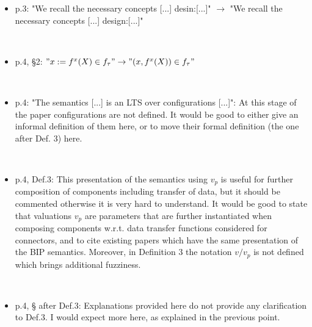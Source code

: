 \begin{itemize}


\item p.3: "We recall the necessary concepts [...] desin:[...]" $\rightarrow$ "We recall the 
necessary concepts [...] design:[...]"

~

\done

\item p.4, §2: $"x := f^x(X) \in f_{\tau}" \rightarrow "(x,f^x(X)) \in f_{\tau}"$

~

\done

\item p.4: "The semantics [...] is an LTS over configurations [...]": At this 
stage of the paper configurations are not defined. It would be good to either 
give an informal definition of them here, or to move their formal definition 
(the one after Def. 3) here.

~

\done
{}


\item p.4, Def.3: This presentation of the semantics using $v_p$ is useful for 
further composition of components including transfer of data, but it should 
be commented otherwise it is very hard to understand. It would be good to 
state that valuations $v_p$ are parameters that are further instantiated when 
composing components w.r.t. data transfer functions considered for 
connectors, and to cite existing papers which have the same presentation of 
the BIP semantics. Moreover, in Definition 3 the notation $v/v_p$ is not 
defined which brings additional fuzziness.

~

\done
{}


\item p.4, § after Def.3: Explanations provided here do not provide any 
clarification to Def.3. I would expect more here, as explained in the 
previous point.


\end{itemize}
